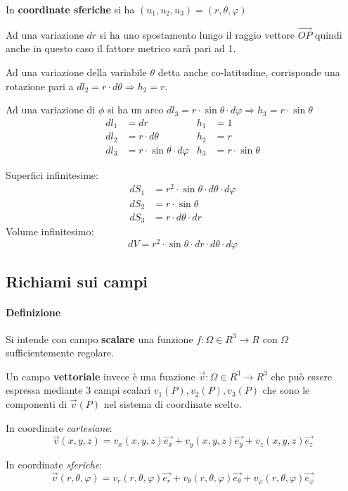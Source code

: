In \textbf{coordinate sferiche} si ha $(u_1,u_2,u_3)=(r,\theta,\varphi)$

Ad una variazione $dr$ si ha uno spostamento lungo il raggio vettore $\vec{OP}$ quindi anche in questo
caso il fattore metrico sarà pari ad 1.

Ad una variazione della variabile $\theta$ detta anche co-latitudine, corrisponde una rotazione
pari a $dl_2 = r\cdot d\theta \Rightarrow h_2 = r$.

Ad una variazione di $\phi$ si ha un arco $dl_3 = r\cdot\sin\theta\cdot d \varphi \Rightarrow h_3 = r\cdot\sin\theta$
\begin{align*}
dl_1 &= dr & h_1 &=1 \\
dl_2 &= r\cdot d\theta & h_2 &=r \\
dl_3 &= r\cdot\sin\theta\cdot d\varphi & h_3 &= r\cdot \sin\theta 
\end{align*}

Superfici infinitesime:
\begin{align*}
dS_1 &= r^2\cdot\sin\theta\cdot d\theta\cdot d\varphi \\
dS_2 &= r\cdot \sin\theta \\
dS_3 &= r\cdot d \theta\cdot dr
\end{align*}
Volume infinitesimo:
$$
dV = r^2\cdot \sin\theta\cdot dr\cdot d\theta\cdot d\varphi
$$

\subsection{Richiami sui campi}
\paragraph{Definizione}
Si intende con campo \textbf{scalare} una funzione $f:\Omega \in R^3 \to R$ con $\Omega$ 
sufficientemente regolare.

Un campo \textbf{vettoriale} invece è una funzione $\vec{v} : \Omega \in R^3 \to R^3$
che può essere espressa mediante 3 campi scalari $v_1(P),v_2(P),v_3(P)$ che sono le componenti
di $\vec{v}(P)$ nel sistema di coordinate scelto.

In coordinate \textit{cartesiane}:
$$
\vec{v}(x,y,z) = v_x(x,y,z)\vec{e_x} + v_y(x,y,z)\vec{e_y} + v_z(x,y,z)\vec{e_z}
$$

In coordinate \textit{sferiche}:
$$
\vec{v}(r,\theta,\varphi) = v_r(r,\theta,\varphi)\vec{e_r} + 
v_\theta(r,\theta,\varphi)\vec{e_\theta} + v_\varphi(r,\theta,\varphi)\vec{e_\varphi}
$$

